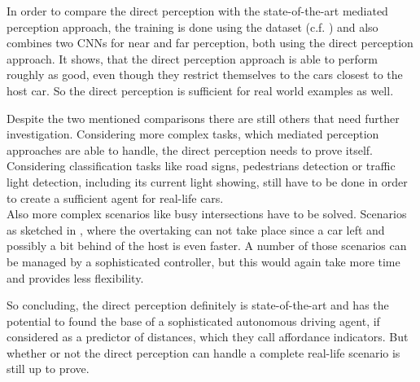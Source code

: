 In order to compare the direct perception with the state-of-the-art mediated perception approach, the training is done using the \kitti dataset (c.f. ) and also combines two CNNs for near and far perception, both using the direct perception approach. It shows, that the direct perception approach is able to perform roughly as good, even though they restrict themselves to the cars closest to the host car. So the direct perception is sufficient for real world examples as well. \cite{DeepDriving} \cite{chen2015deepdriving}

Despite the two mentioned comparisons there are still others that need further investigation. Considering more complex tasks, which mediated perception approaches are able to handle, the direct perception needs to prove itself.
Considering classification tasks like road signs, pedestrians detection or traffic light detection, including its current light showing, still have to be done in order to create a sufficient agent for real-life cars. \\
Also more complex scenarios like busy intersections have to be solved. Scenarios as sketched in , where the overtaking can not take place since a car left and possibly a bit behind of the host is even faster.
A number of those scenarios can be managed by a sophisticated controller, but this would again take more time and provides less flexibility.

So concluding, the direct perception definitely is state-of-the-art and has the potential to found the base of a sophisticated autonomous driving agent, if considered as a predictor of distances, which they call affordance indicators. But whether or not the direct perception can handle a complete real-life scenario is still up to prove.